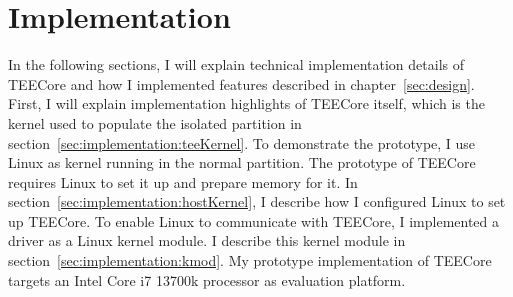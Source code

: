 \chapter{Implementation}
\label{sec:implementation}


In the following sections, I will explain technical implementation details of
TEECore and how I implemented features described in chapter~\ref{sec:design}.
First, I will explain implementation highlights of TEECore itself, which is the
kernel used to populate the isolated partition in
section~\ref{sec:implementation:teeKernel}. To demonstrate the prototype, I use
Linux as kernel running in the normal partition. The prototype of TEECore
requires Linux to set it up and prepare memory for it. In
section~\ref{sec:implementation:hostKernel}, I describe how I configured Linux
to set up TEECore. To enable Linux to communicate with TEECore, I implemented a
driver as a Linux kernel module. I describe this kernel module in
section~\ref{sec:implementation:kmod}. My prototype implementation of TEECore
targets an Intel Core i7 13700k processor as evaluation platform.

